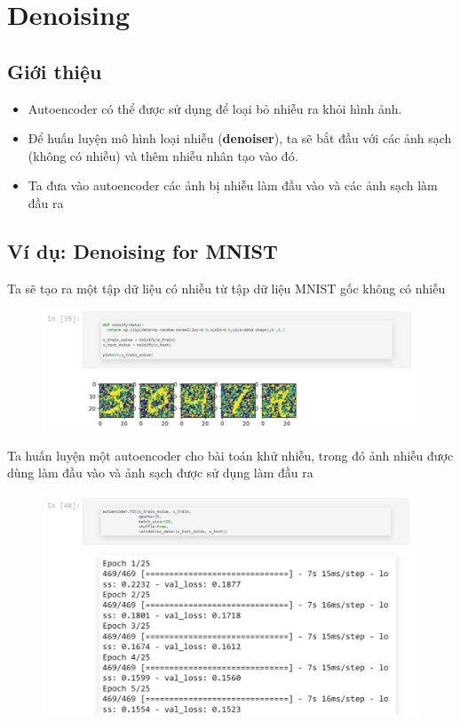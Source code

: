 \documentclass{book}
\begin{document}
\section{Denoising}
\subsection{Giới thiệu}
\begin{itemize}
	\item Autoencoder có thể được sử dụng để loại bỏ nhiễu ra khỏi hình ảnh.
	\item Để huấn luyện mô hình loại nhiễu (\textbf{denoiser}), ta sẽ bắt đầu với các ảnh sạch (không có nhiễu) và thêm nhiễu nhân tạo vào đó.
	\item Ta đưa vào autoencoder các ảnh bị nhiễu làm đầu vào và các ảnh sạch làm đầu ra
\end{itemize}

\subsection{Ví dụ: Denoising for MNIST}
Ta sẽ tạo ra một tập dữ liệu có nhiễu từ tập dữ liệu MNIST gốc không có nhiễu
\begin{figure}[H]
	\centering
	\includegraphics[width=0.75\linewidth]{images/au14.png}
\end{figure}

Ta huấn luyện một autoencoder cho bài toán khử nhiễu, trong đó ảnh nhiễu được dùng làm đầu vào và ảnh sạch được sử dụng làm đầu ra

\begin{figure}[H]
	\centering
	\includegraphics[width=0.75\linewidth]{images/au15.png}
\end{figure}
\end{document}
